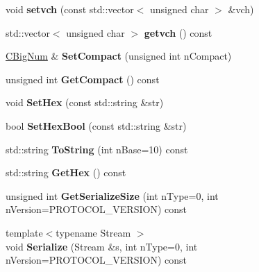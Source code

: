 \begin{DoxyCompactItemize}
\item 
\mbox{\label{class_c_big_num_aa9236c14e34519e9b173a9a4b80f5621}} 
void {\bfseries setvch} (const std\+::vector$<$ unsigned char $>$ \&vch)
\item 
\mbox{\label{class_c_big_num_a305a57111c97172c76a6145ec840bd74}} 
std\+::vector$<$ unsigned char $>$ {\bfseries getvch} () const
\item 
\mbox{\label{class_c_big_num_a27e3ca82a40ae0c34ac4c059e4d0d66c}} 
\mbox{\hyperlink{class_c_big_num}{C\+Big\+Num}} \& {\bfseries Set\+Compact} (unsigned int n\+Compact)
\item 
\mbox{\label{class_c_big_num_aa874461cf2cfb497f2c9f20e66106d0b}} 
unsigned int {\bfseries Get\+Compact} () const
\item 
\mbox{\label{class_c_big_num_a9d4f7c42f141e45410af96e6804c54fe}} 
void {\bfseries Set\+Hex} (const std\+::string \&str)
\item 
\mbox{\label{class_c_big_num_a2e56f585db3f9d887bb945de8a36d4a5}} 
bool {\bfseries Set\+Hex\+Bool} (const std\+::string \&str)
\item 
\mbox{\label{class_c_big_num_a10da7a8b4984feee0bb0f01ef2e74da8}} 
std\+::string {\bfseries To\+String} (int n\+Base=10) const
\item 
\mbox{\label{class_c_big_num_a7b3bda0e9860ce67d99ea6e229cdd648}} 
std\+::string {\bfseries Get\+Hex} () const
\item 
\mbox{\label{class_c_big_num_afc5b1e40f9267193a628b74fec2ffb4c}} 
unsigned int {\bfseries Get\+Serialize\+Size} (int n\+Type=0, int n\+Version=P\+R\+O\+T\+O\+C\+O\+L\+\_\+\+V\+E\+R\+S\+I\+ON) const
\item 
\mbox{\label{class_c_big_num_a87d4f1eaad6af2c2b3d85d43befae725}} 
{\footnotesize template$<$typename Stream $>$ }\\void {\bfseries Serialize} (Stream \&s, int n\+Type=0, int n\+Version=P\+R\+O\+T\+O\+C\+O\+L\+\_\+\+V\+E\+R\+S\+I\+ON) const

\end{DoxyCompactItemize}
